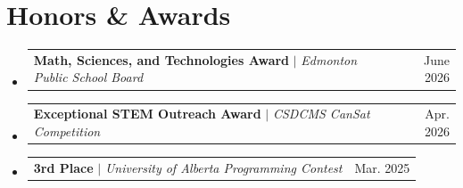 \documentclass[letterpaper,11pt]{article}
\makeatletter
\newcommand{\resumeProjectHeading}[2]{
    \item
    \begin{tabular*}{0.97\textwidth}{l@{\extracolsep{\fill}}r}
      \small#1 & #2 \\
    \end{tabular*}\vspace{-7pt}
}
\newcommand{\resumeSubHeadingListStart}{\begin{itemize}[leftmargin=0.15in, label={}]}
\newcommand{\resumeSubHeadingListEnd}{\end{itemize}}
\makeatother
\begin{document}

%

\section{Honors \& Awards}
  \resumeSubHeadingListStart
    \resumeProjectHeading
      {\textbf{Math, Sciences, and Technologies Award} $|$ \emph{Edmonton Public School Board}}{June 2026}
    \resumeProjectHeading
      {\textbf{Exceptional STEM Outreach Award} $|$ \emph{CSDCMS CanSat Competition}}{Apr. 2026}
    \resumeProjectHeading
      {\textbf{3rd Place} $|$ \emph{University of Alberta Programming Contest}}{Mar. 2025}
  \resumeSubHeadingListEnd

\end{document}
